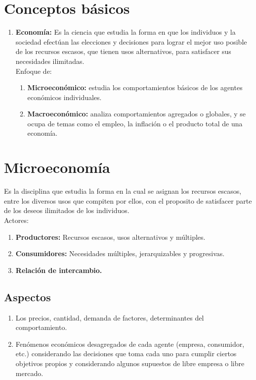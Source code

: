 \documentclass{templateNote}
\begin{document}
\portada
\margenes %


\section{Conceptos básicos}
\begin{enumerate}
    \item \textbf{Economía:} Es la ciencia que estudia la forma en que los individuos y la sociedad efectúan las elecciones y decisiones para lograr el mejor uso posible de los recursos escasos, que tienen usos alternativos, para satisfacer sus necesidades ilimitadas.\\
    
    Enfoque de:
    \begin{enumerate}
        \item \textbf{Microeconómico:} estudia los comportamientos básicos de los
        agentes económicos individuales.
        \item \textbf{Macroeconómico:} analiza comportamientos agregados o
        globales, y se ocupa de temas como el empleo, la inflación o el
        producto total de una economía.
    \end{enumerate}
    
\end{enumerate}

\section{Microeconomía}
\indent
Es la disciplina que estudia la forma en la cual
se asignan los recursos escasos, entre los diversos usos que
compiten por ellos, con el proposito de satisfacer parte de los
deseos ilimitados de los individuos.\\
Actores:
\begin{enumerate}
    \item \textbf{Productores:} Recursos escasos, usos alternativos y múltiples.
    \item \textbf{Consumidores:} Necesidades múltiples, jerarquizables y progresivas. 
    \item \textbf{Relación de intercambio.}
\end{enumerate} 

\subsection{Aspectos}
\begin{enumerate}
    \item Los precios, cantidad, demanda de factores, determinantes del
    comportamiento.
    
    \item Fenómenos económicos desagregados de cada agente (empresa,
    consumidor, etc.) considerando las decisiones que toma cada uno
    para cumplir ciertos objetivos propios y considerando algunos
    supuestos de libre empresa o libre mercado.
\end{enumerate}
\end{document}
